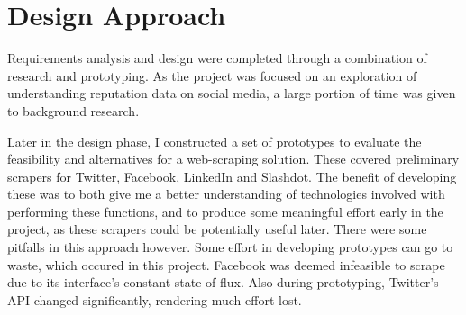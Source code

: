 





\section{Design Approach}

Requirements analysis and design were completed through a combination of research and prototyping. As the project was focused on an exploration of understanding reputation data on social media, a large portion of time was given to background research.

Later in the design phase, I constructed a set of prototypes to evaluate the feasibility and alternatives for a web-scraping solution. These covered preliminary scrapers for Twitter, Facebook, LinkedIn and Slashdot. The benefit of developing these was to both give me a better understanding of technologies involved with performing these functions, and to produce some meaningful effort early in the project, as these scrapers could be potentially useful later. There were some pitfalls in this approach however. Some effort in developing prototypes can go to waste, which occured in this project. Facebook was deemed infeasible to scrape due to its interface's constant state of flux. Also during prototyping, Twitter's API changed significantly, rendering much effort lost.



